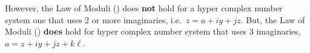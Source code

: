 However, the Law of Moduli () does \textbf{not} hold for a hyper complex number system one that uses 2 or more imaginaries, i.e.\ $z = a + iy + jz$.
But, the Law of Moduli () \textbf{does} hold for hyper complex number system that uses 3 imaginaries, $a = z + iy + jz + k \ell$.


